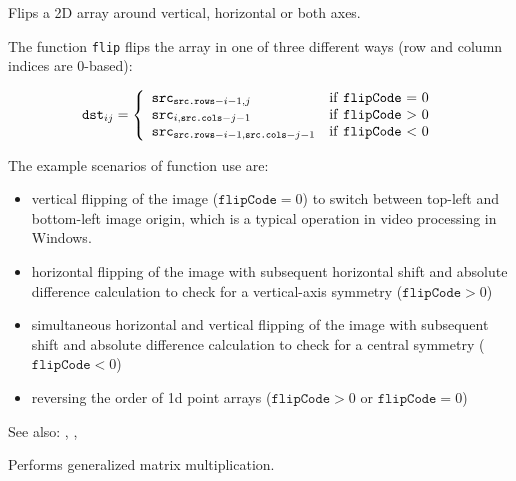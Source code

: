 Flips a 2D array around vertical, horizontal or both axes.

\begin{description}
\end{description}

The function \texttt{flip} flips the array in one of three different ways (row and column indices are 0-based):

\[
\texttt{dst}_{ij} = \left\{ \begin{array}{l l} \texttt{src}_{\texttt{src.rows}-i-1,j} & \mbox{if \texttt{flipCode} = 0}\\ \texttt{src}_{i,\texttt{src.cols}-j-1} & \mbox{if \texttt{flipCode} > 0}\\ \texttt{src}_{\texttt{src.rows}-i-1,\texttt{src.cols}-j-1} & \mbox{if \texttt{flipCode} < 0}\\ \end{array} \right.
\]

The example scenarios of function use are:
\begin{itemize}
  \item vertical flipping of the image ($\texttt{flipCode} = 0$) to switch between top-left and bottom-left image origin, which is a typical operation in video processing in Windows.
  \item horizontal flipping of the image with subsequent horizontal shift and absolute difference calculation to check for a vertical-axis symmetry ($\texttt{flipCode} > 0$)
  \item simultaneous horizontal and vertical flipping of the image with subsequent shift and absolute difference calculation to check for a central symmetry ($\texttt{flipCode} < 0$)
  \item reversing the order of 1d point arrays ($\texttt{flipCode} > 0$ or $\texttt{flipCode} = 0$)
\end{itemize}

See also: , , 

Performs generalized matrix multiplication.

